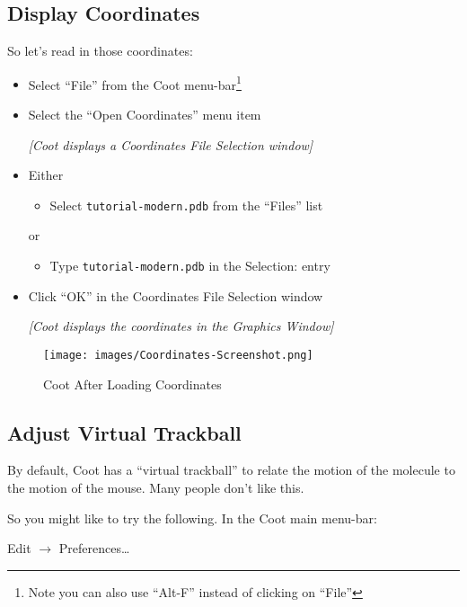 \documentclass{article}
\begin{document}
\subsection{Display Coordinates}
So let's read in those coordinates:

\begin{itemize}
\item Select \textsf{``File''} from the Coot menu-bar\footnote{Note
    you can also use ``Alt-F'' instead of clicking on ``File''}
\item Select the \textsf{``Open Coordinates''} menu item

\textsl{  [Coot displays a Coordinates File Selection window]}

\item Either
  \begin{itemize}
  \item Select \texttt{tutorial-modern.pdb} from the ``Files'' list
  \end{itemize}
  or
  \begin{itemize}
  \item Type \texttt{tutorial-modern.pdb} in the Selection: entry
  \end{itemize}
\item Click \textsf{``OK''} in the Coordinates File Selection window

\textsl{  [Coot displays the coordinates in the Graphics Window]}

\end{itemize}

\begin{figure}[htbp]
  \begin{center}
    \leavevmode
    \texttt{[image: images/Coordinates-Screenshot.png]}
    \caption{Coot After Loading Coordinates}
    \label{fig:coordinates-coot}
  \end{center}
\end{figure}

\subsection{Adjust Virtual Trackball}
By default, Coot has a ``virtual trackball'' to relate the motion of
the molecule to the motion of the mouse.  Many people don't like this.

So you might like to try the following. In the Coot main menu-bar:

\textsf{Edit $\rightarrow$ Preferences\ldots}
\end{document}
